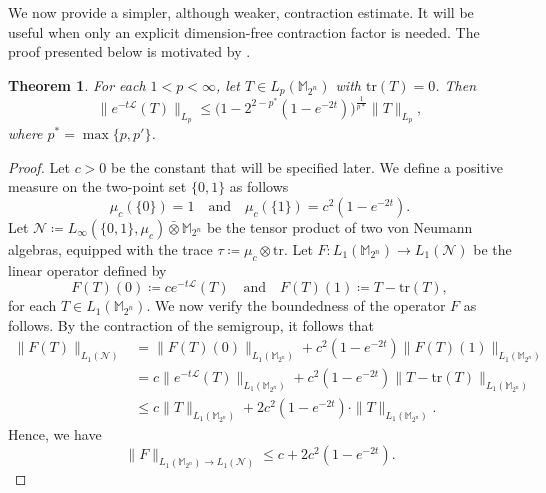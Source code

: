\documentclass{amsbook}
\newtheorem{theorem}{Theorem}[chapter]
\theoremstyle{definition}
\theoremstyle{remark}
\numberwithin{section}{chapter}
\numberwithin{equation}{chapter}
\newcommand{\1}{\mathbf{1}}
\begin{document}
We now provide a simpler, although weaker, contraction estimate.  It will be useful when only an explicit dimension-free contraction factor is needed. The proof presented below is motivated by \cite[Proposition 4.1]{HMO2017}. 
\begin{theorem}\label{heat-inter}
For each $1<p<\infty$, let $T\in L_{p}(\mathbb{M}_{2^n})$ with $\mathrm{tr}(T)=0$. Then
$$\|e^{-t\mathcal{L}}(T)\|_{L_p}\leq \big(1-2^{2-p^*}(1-e^{-2t})\big)^{\frac{1}{p*}}\|T\|_{L_p},$$
where $p^*=\max\{p,p'\}$.
\end{theorem} 

\begin{proof}
Let $c>0$ be the constant that will be specified later. We define a positive measure on the two-point set $\{0,1\}$ as follows
\[
\mu_{c}(\{0\})=1\quad\mbox{and}\quad \mu_{c}(\{1\})=c^{2}(1-e^{-2t}).
\]
Let $\mathcal{N}\coloneqq L_{\infty}(\{0,1\},\mu_{c})\bar\otimes \mathbb{M}_{2^{n}}$ be the tensor product of two von Neumann algebras, equipped with the trace $\tau\coloneqq \mu_{c}\otimes \mathrm{tr}$. Let $F:L_{1}(\mathbb{M}_{2^{n}})\to L_{1}(\mathcal{N})$ be the linear operator defined by
\[
F(T)(0)\coloneqq c e^{-t\mathcal{L}}(T)\quad\mbox{and}\quad F(T)(1)\coloneqq T-\mathrm{tr}(T),
\]
for each $T\in L_{1}(\mathbb{M}_{2^{n}})$. We now verify the boundedness of the operator $F$ as follows. By the contraction of the semigroup, it follows that
\begin{align*}
\|F(T)\|_{L_1(\mathcal{N})}&=\|F(T)(0)\|_{L_1(\mathbb{M}_{2^n})}+c^2(1-e^{-2t})\|F(T)(1)\|_{L_1(\mathbb{M}_{2^n})}\\
&=c\|e^{-t\mathcal{L}}(T)\|_{L_1(\mathbb{M}_{2^n})}+c^2(1-e^{-2t})\|T-\mathrm{tr}(T)\|_{L_1(\mathbb{M}_{2^n})}\\
&\leq c\|T\|_{L_1(\mathbb{M}_{2^n})}+2c^2(1-e^{-2t})\cdot\|T\|_{L_1(\mathbb{M}_{2^n})}.
\end{align*}
Hence, we have
\begin{equation}\label{f-11}
\|F\|_{L_1(\mathbb{M}_{2^n})\to L_1(\mathcal{N})}\leq c+2c^2(1-e^{-2t}).
\end{equation}



\end{proof}
\end{document}
